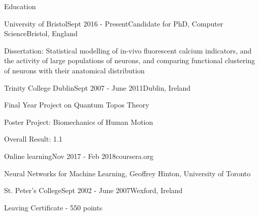 \documentclass{resume} %
\begin{document}

\begin{rSection}{Education}
  \begin{rSubsection}{University of Bristol}{Sept 2016 - Present}{Candidate for PhD, Computer Science}{Bristol, England}
    \item Dissertation: Statistical modelling of in-vivo fluorescent calcium indicators, and the activity of large populations of neurons, and comparing functional clustering of neurons with their anatomical distribution
  \end{rSubsection}


  \begin{rSubsection}{Trinity College Dublin}{Sept 2007 - June 2011}{Dublin, Ireland}
    \item Final Year Project on Quantum Topos Theory 
    \item Poster Project: Biomechanics of Human Motion 
    \item Overall Result: 1.1
  \end{rSubsection}

  \begin{rSubsection}{Online learning}{Nov 2017 - Feb 2018}{coursera.org}
    \item Neural Networks for Machine Learning, Geoffrey Hinton, University of Toronto 
  \end{rSubsection}

  \begin{rSubsection}{St. Peter's College}{Sept 2002 - June 2007}{Wexford, Ireland}
    \item Leaving Certificate - 550 points   
  \end{rSubsection}
\end{rSection}
\end{document}
